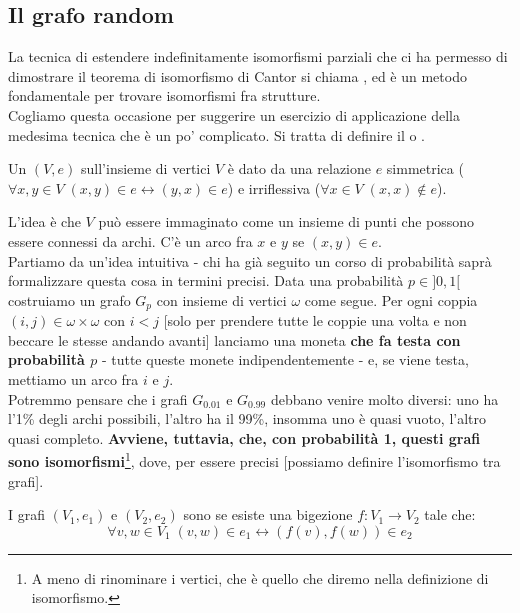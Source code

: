 \documentclass[11pt]{scrartcl}
\begin{document}
\subsection{Il grafo random}

La tecnica di estendere indefinitamente isomorfismi parziali che ci ha permesso di dimostrare il teorema di isomorfismo di Cantor
si chiama , ed è un metodo fondamentale per trovare isomorfismi fra strutture.\\
Cogliamo questa occasione per suggerire un esercizio di applicazione della medesima tecnica che è un po' complicato. Si tratta di definire il 
o .

\begin{definition}[Grafo]
	Un  $(V,e)$ sull'insieme di vertici $V$ è dato da una relazione $e$ simmetrica ($\forall x,y \in V \; (x,y) \in e \leftrightarrow (y,x) \in e$) e 
	irriflessiva ($\forall x \in V \; (x,x) \not\in e$).
\end{definition}

L'idea è che $V$ può essere immaginato come un insieme di punti che possono essere connessi da archi. C'è un arco fra $x$ e $y$ se $(x,y) \in e$.\\
%
Partiamo da un'idea intuitiva -  chi ha già seguito un corso di probabilità saprà formalizzare questa cosa in termini precisi. Data una probabilità $p \in ]0,1[$ costruiamo un grafo
$G_p$ con insieme di vertici $\omega$ come segue. Per ogni coppia $(i,j) \in \omega \times \omega$ con $i < j$ [solo per prendere tutte le coppie una volta e non beccare le stesse andando avanti] lanciamo una moneta \textbf{che fa testa con probabilità $p$} - tutte queste monete indipendentemente - e, se viene testa, mettiamo un arco 
fra $i$ e $j$.\\
Potremmo pensare che i grafi $G_{0.01}$ e $G_{0.99}$ debbano venire molto diversi: uno ha l'1\% degli archi possibili, l'altro ha il 99\%, insomma uno è quasi vuoto, l'altro quasi completo. \textbf{Avviene, tuttavia, che, con probabilità 1, questi grafi sono isomorfismi}\footnote{A meno di rinominare i vertici, che è quello che diremo nella definizione di isomorfismo.}, dove, per essere precisi
[possiamo definire l'isomorfismo tra grafi].

\begin{definition}
	I grafi $(V_1,e_1)$ e $(V_2,e_2)$ sono  se esiste una bigezione $f : V_1 \rightarrow V_2$ tale che:
	\[ \forall v,w \in V_1 \; (v,w) \in e_1 \longleftrightarrow (f(v),f(w)) \in e_2
		\]
\end{definition}
\end{document}
